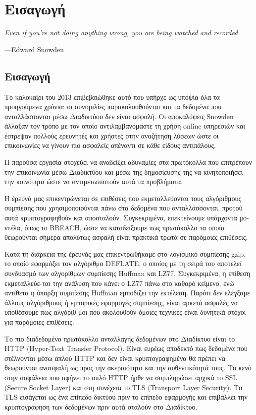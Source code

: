 \chapter{Εισαγωγή}\label{ch:intro}
\epigraph{\itshape Even if you're not doing anything wrong, you are being watched and
recorded.}{---Edward Snowden}

\section{Εισαγωγή}\label{sec:intro}

Το καλοκαίρι του 2013 επιβεβαιώθηκε αυτό που υπήρχε ως υποψία όλα τα προηγούμενα
χρόνια: οι συνομιλίες παρακολουθούνται και τα δεδομένα που ανταλλάσσονται μέσω
Διαδικτύου δεν είναι ασφαλή. Οι αποκαλύψεις Snowden άλλαξαν τον τρόπο με τον
οποίο αντιλαμβανόμαστε τη χρήση online υπηρεσιών και έστρεψαν πολλούς ερευνητές
και χρήστες στην αναζήτηση λύσεων ώστε οι επικοινωνίες να γίνουν πιο ασφαλείς
απέναντι σε κάθε είδους αντιπάλους.

Η παρούσα εργασία στοχεύει να αναδείξει αδυναμίες στα πρωτόκολλα που επιτρέπουν
την επικοινωνία μέσω Διαδικτύου και μέσω της δημοσίευσής της να κινητοποιήσει
την κοινότητα ώστε να αντιμετωπιστούν αυτά τα προβλήματα.

Η έρευνά μας επικεντρώνεται σε επιθέσεις που εκμεταλλεύονται τους αλγόριθμους
συμπίεσης που χρησιμοποιούνται πάνω στα δεδομένα που ανταλλάσσονται, προτού αυτά
κρυπτογραφηθούν και αποσταλούν. Συγκεκριμένα, επεκτείνουμε υπάρχοντα μο-ντέλα,
όπως το BREACH, ώστε να καταδείξουμε πως πρωτόκολλα τα οποία θεωρούνται σήμερα
απολύτως ασφαλή είναι πρακτικά τρωτά σε παρόμοιες επιθέσεις.

Κατά τη διάρκεια της έρευνάς μας επικεντρωθήκαμε στο λογισμικό συμπίεσης gzip,
το οποίο εφαρμόζει τον αλγόριθμο DEFLATE, ο οποίος με τη σειρά του αποτελεί
συνδυασμό των αλγορίθμων συμπίεσης Huffman και LZ77. Συγκεκριμένα, η επίθεση
εκμεταλλεύε-ται την ανάλυση που κάνει ο LZ77 πάνω στο καθαρό κείμενο, ενώ
αντίθετα η ύπαρξη συμπίεσης Huffman εμποδίζει την εκτέλεση. Παρότι δεν ελέγξαμε
άλλους αλγόριθμους ή εμπορικές εφαρμογές συμπίεσης, είναι αρκετά ασφαλές να
υποθέσουμε πως αλγόριθ-μοι που ακολουθούν όμοιες τεχνικές είναι δυνητικά στόχοι
για παρόμοιες επιθέσεις.

Το πιο διαδεδομένο πρωτόκολλο ανταλλαγής δεδομένων στο Διαδίκτυο είναι το HTTP
(Hyper-Text Transfer Protocol). Είναι ευρέως αποδεκτό πως δεδομένα που
στέλνονται μέσω απλού HTTP και δεν είναι κρυπτογραφημένα θα πρέπει να
θεωρούνται ανασφαλή ως προς την ακεραιότητα και την αυθεντικότητά τους. Το κενό
στην ασφάλεια που αφήνει το απλό HTTP ήρθε να συμπληρώσει αρχικά το SSL (Secure
Socket Layer) και στη συνέχεια το TLS (Transport Layer Security). Το TLS
εισάγεται ως ένα επίπεδο δικτύου πριν το επίπεδο εφαρμογής και επιβάλλει την
κρυπτογράφηση των δεδομένων πριν αυτά σταλούν στο Διαδίκτυο.

